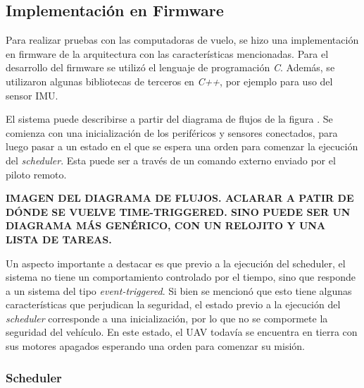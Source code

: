 \subsection{Implementación en Firmware}



Para realizar pruebas con las computadoras de vuelo, se hizo una implementación en firmware de la arquitectura con las características mencionadas. Para el desarrollo del firmware se utilizó el lenguaje de programación \textit{C}. Además, se utilizaron algunas bibliotecas de terceros en \textit{C++}, por ejemplo para uso del sensor IMU.

El sistema puede describirse a partir del diagrama de flujos de la figura  . Se comienza con una inicialización de los periféricos y sensores conectados, para luego pasar a un estado en el que se espera una orden para comenzar la ejecución del \textit{scheduler}. Esta puede ser a través de un comando externo enviado por el piloto remoto.

{\Large \textbf{{\color{red} IMAGEN DEL DIAGRAMA DE FLUJOS. ACLARAR A PATIR DE DÓNDE SE VUELVE TIME-TRIGGERED. SINO PUEDE SER UN DIAGRAMA MÁS GENÉRICO, CON UN RELOJITO Y UNA LISTA DE TAREAS.}}}

Un aspecto importante a destacar es que previo a la ejecución del scheduler, el sistema no tiene un comportamiento controlado por el tiempo, sino que responde a un sistema del tipo \textit{event-triggered}. Si bien se mencionó que esto tiene algunas características que perjudican la seguridad, el estado previo a la ejecución del \textit{scheduler} corresponde a una inicialización, por lo que no se compormete la seguridad del vehículo. En este estado, el UAV todavía se encuentra en tierra con sus motores apagados esperando una orden para comenzar su misión.

\subsubsection{Scheduler}


